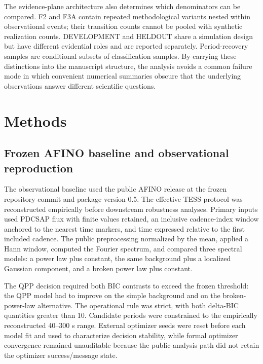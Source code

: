 \documentclass[manuscript,linenumbers]{aastex702}
\begin{document}
The evidence-plane architecture also determines which denominators can be compared. F2 and F3A contain repeated methodological variants nested within observational events; their transition counts cannot be pooled with synthetic realization counts. DEVELOPMENT and HELDOUT share a simulation design but have different evidential roles and are reported separately. Period-recovery samples are conditional subsets of classification samples. By carrying these distinctions into the manuscript structure, the analysis avoids a common failure mode in which convenient numerical summaries obscure that the underlying observations answer different scientific questions.

\section{Methods}
\subsection{Frozen AFINO baseline and observational reproduction}
The observational baseline used the public AFINO release at the frozen repository commit and package version 0.5. The effective TESS protocol was reconstructed empirically before downstream robustness analyses. Primary inputs used PDCSAP flux with finite values retained, an inclusive cadence-index window anchored to the nearest time markers, and time expressed relative to the first included cadence. The public preprocessing normalized by the mean, applied a Hann window, computed the Fourier spectrum, and compared three spectral models: a power law plus constant, the same background plus a localized Gaussian component, and a broken power law plus constant.

The QPP decision required both BIC contrasts to exceed the frozen threshold: the QPP model had to improve on the simple background and on the broken-power-law alternative. The operational rule was strict, with both delta-BIC quantities greater than 10. Candidate periods were constrained to the empirically reconstructed 40--300 s range. External optimizer seeds were reset before each model fit and used to characterize decision stability, while formal optimizer convergence remained unauditable because the public analysis path did not retain the optimizer success/message state.
\end{document}
